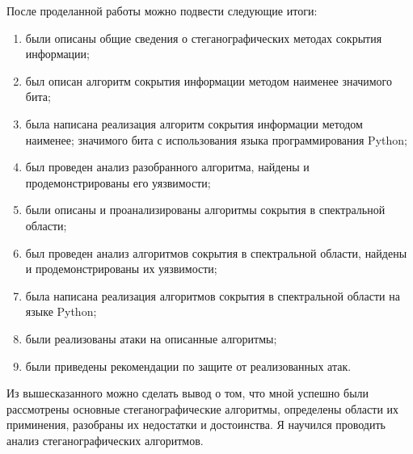\Conclusion
После проделанной работы можно подвести следующие итоги:
\begin{enumerate}
    \item были описаны общие сведения о стеганографических методах сокрытия информации;
    \item был описан алгоритм сокрытия информации методом наименее значимого бита;
    \item была написана реализация алгоритм сокрытия информации методом наименее;
    значимого бита с использования языка программирования Python;
    \item был проведен анализ разобранного алгоритма, найдены и продемонстрированы
    его уязвимости;
    \item были описаны и проанализированы алгоритмы сокрытия в спектральной области;
    \item был проведен анализ алгоритмов сокрытия в спектральной области,
    найдены и продемонстрированы их уязвимости;
    \item была написана реализация алгоритмов сокрытия в спектральной области на языке Python;
    \item были реализованы атаки на описанные алгоритмы;
    \item были приведены рекомендации по защите от реализованных атак.
\end{enumerate}

Из вышесказанного можно сделать вывод о том, что мной успешно были
рассмотрены основные стеганографические алгоритмы, определены области их приминения,
разобраны их недостатки и достоинства. Я научился проводить анализ стеганографических алгоритмов.